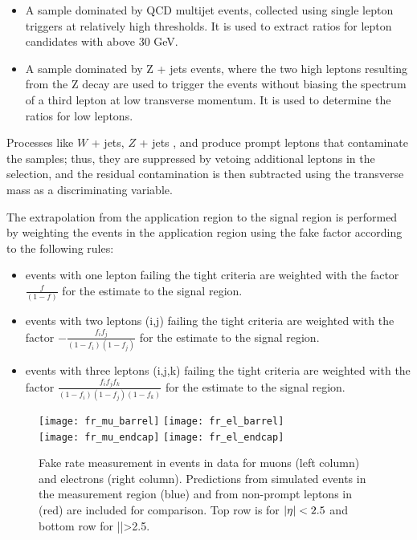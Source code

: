 \begin{itemize}
\item A sample dominated by QCD multijet events, collected using single lepton triggers at relatively high \pt thresholds. It is used to extract ratios for lepton candidates with \pt above 30 GeV.
\item A sample dominated by Z + jets events, where the two high \pt leptons resulting from the Z decay are used to trigger the events without biasing the \pt spectrum of a third lepton at low transverse momentum. It is used to determine the ratios for low \pt leptons. 
\end{itemize}

Processes like $W$ + jets, $Z$ + jets , \WZ and \ZZ produce prompt leptons that contaminate the samples; thus, they are suppressed by vetoing additional leptons in the selection, and the residual contamination is then subtracted using the transverse mass as a discriminating variable.

The extrapolation from the application region to the signal region is performed by weighting the events in the application region using the fake factor according to the following rules:

\begin{itemize}
\item events with one lepton failing the tight criteria are weighted with the factor $\frac{f}{(1-f)}$ for the estimate to the signal region. 
\item events with two leptons (i,j) failing the tight criteria are weighted with the factor $-\frac{f_if_j}{(1-f_i)(1-f_j)}$ for the estimate to the signal region. 
\item events with three leptons (i,j,k) failing the tight criteria are weighted with the factor $\frac{f_if_jf_k}{(1-f_i)(1-f_j)(1-f_k)}$ for the estimate to the signal region. 
\end{itemize}

\begin{figure}[htb]
\centering
        \texttt{[image: fr\_mu\_barrel]}
        \texttt{[image: fr\_el\_barrel]} \\
        \texttt{[image: fr\_mu\_endcap]}
        \texttt{[image: fr\_el\_endcap]}
\caption[Fake rates]{Fake rate measurement in events in data for muons (left column) and electrons (right column). Predictions from simulated events in the measurement region (blue) and from non-prompt leptons in \ttbar (red) are included for comparison. Top row is for $|\eta|<2.5$ and bottom row for |\etac|>2.5.}
\label{fig:frmeas-comb-data}
\end{figure}

